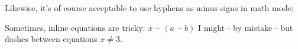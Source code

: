 \documentclass{article}
\begin{document}

Likewise, it's of course acceptable to use hyphens as minus signs in math mode: 

Sometimes, inline equations are tricky: \(x - (a - b)\) I might - by mistake - but dashes between equations \(x \neq 3\).
\end{document}
